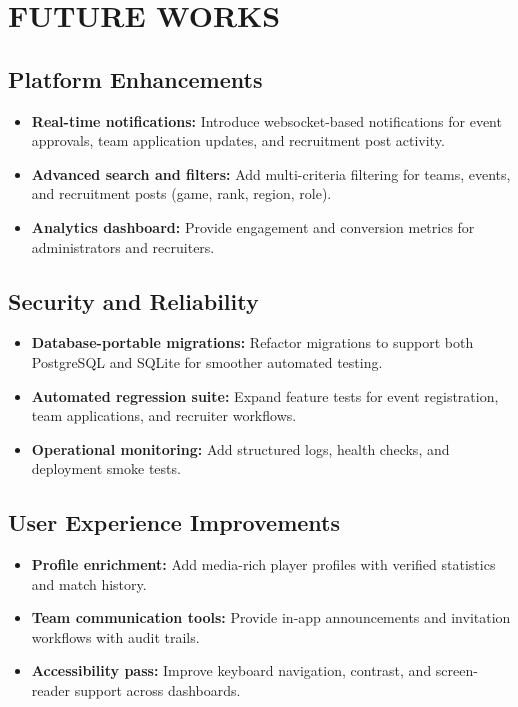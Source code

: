 \chapter{FUTURE WORKS}

\section{Platform Enhancements}
\begin{itemize}
    \item \textbf{Real-time notifications:} Introduce websocket-based notifications for event approvals, team application updates, and recruitment post activity.
    \item \textbf{Advanced search and filters:} Add multi-criteria filtering for teams, events, and recruitment posts (game, rank, region, role).
    \item \textbf{Analytics dashboard:} Provide engagement and conversion metrics for administrators and recruiters.
\end{itemize}

\section{Security and Reliability}
\begin{itemize}
    \item \textbf{Database-portable migrations:} Refactor migrations to support both PostgreSQL and SQLite for smoother automated testing.
    \item \textbf{Automated regression suite:} Expand feature tests for event registration, team applications, and recruiter workflows.
    \item \textbf{Operational monitoring:} Add structured logs, health checks, and deployment smoke tests.
\end{itemize}

\section{User Experience Improvements}
\begin{itemize}
    \item \textbf{Profile enrichment:} Add media-rich player profiles with verified statistics and match history.
    \item \textbf{Team communication tools:} Provide in-app announcements and invitation workflows with audit trails.
    \item \textbf{Accessibility pass:} Improve keyboard navigation, contrast, and screen-reader support across dashboards.
\end{itemize}
